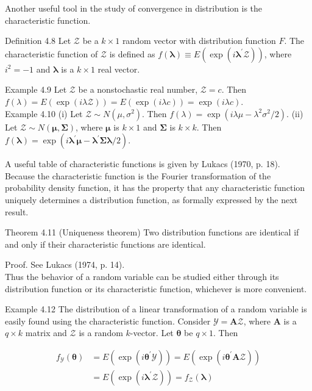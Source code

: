 \documentclass[10pt]{article}
\begin{document}
Another useful tool in the study of convergence in distribution is the characteristic function.

Definition 4.8 Let $\mathcal{Z}$ be a $k \times 1$ random vector with distribution function $F$. The characteristic function of $\mathcal{Z}$ is defined as $f(\boldsymbol{\lambda}) \equiv E\left(\exp \left(i \boldsymbol{\lambda}^{\prime} \mathcal{Z}\right)\right)$, where $i^{2}=-1$ and $\boldsymbol{\lambda}$ is a $k \times 1$ real vector.

Example 4.9 Let $\mathcal{Z}$ be a nonstochastic real number, $\mathcal{Z}=c$. Then $f(\lambda)= E(\exp (i \lambda \mathcal{Z}))=E(\exp (i \lambda c))=\exp (i \lambda c)$.\\
Example 4.10 (i) Let $\mathcal{Z} \sim N\left(\mu, \sigma^{2}\right)$. Then $f(\lambda)=\exp \left(i \lambda \mu-\lambda^{2} \sigma^{2} / 2\right)$. (ii) Let $\mathcal{Z} \sim N(\boldsymbol{\mu}, \boldsymbol{\Sigma})$, where $\boldsymbol{\mu}$ is $k \times 1$ and $\boldsymbol{\Sigma}$ is $k \times k$. Then $f(\boldsymbol{\lambda})= \exp \left(i \boldsymbol{\lambda}^{\prime} \boldsymbol{\mu}-\boldsymbol{\lambda}^{\prime} \boldsymbol{\Sigma} \boldsymbol{\lambda} / 2\right)$.

A useful table of characteristic functions is given by Lukacs (1970, p. 18).\\
Because the characteristic function is the Fourier transformation of the probability density function, it has the property that any characteristic function uniquely determines a distribution function, as formally expressed by the next result.

Theorem 4.11 (Uniqueness theorem) Two distribution functions are identical if and only if their characteristic functions are identical.

Proof. See Lukacs (1974, p. 14).\\
Thus the behavior of a random variable can be studied either through its distribution function or its characteristic function, whichever is more convenient.

Example 4.12 The distribution of a linear transformation of a random variable is easily found using the characteristic function. Consider $\mathcal{Y}= \mathbf{A} \mathcal{Z}$, where $\mathbf{A}$ is a $q \times k$ matrix and $\mathcal{Z}$ is a random $k$-vector. Let $\boldsymbol{\theta}$ be $q \times 1$. Then

$$
\begin{aligned}
f_{\mathcal{Y}}(\boldsymbol{\theta}) & =E\left(\exp \left(i \boldsymbol{\theta}^{\prime} \mathcal{Y}\right)\right)=E\left(\exp \left(i \boldsymbol{\theta}^{\prime} \mathbf{A} \mathcal{Z}\right)\right) \\
& =E\left(\exp \left(i \boldsymbol{\lambda}^{\prime} \mathcal{Z}\right)\right)=f_{\mathcal{Z}}(\boldsymbol{\lambda})
\end{aligned}
$$
\end{document}
